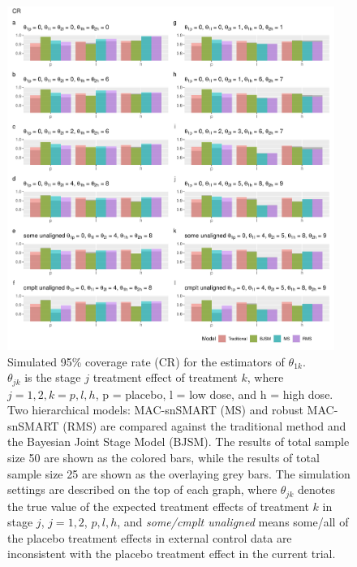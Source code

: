 \begin{figure}
\includegraphics[width=0.95\textwidth]{chapters/figures/CR.pdf}
\caption{Simulated 95\% coverage rate (CR) for the estimators of $\theta_{1k}$.\\ $\theta_{jk}$ is the stage $j$ treatment effect of treatment $k$, where $j = 1,2, k = p, l, h$, p = placebo, l = low dose, and h = high dose. Two hierarchical models: MAC-snSMART (MS) and robust MAC-snSMART (RMS) are compared against the traditional method and the Bayesian Joint Stage Model (BJSM). The results of total sample size 50 are shown as the colored bars, while the results of total sample size 25 are shown as the overlaying grey bars. The simulation settings are described on the top of each graph, where $\theta_{jk}$ denotes the true value of the expected treatment effects of treatment $k$ in stage $j$, $j = 1, 2$, $p, l, h$, and \emph{some/cmplt unaligned} means some/all of the placebo treatment effects in external control data are inconsistent with the placebo treatment effect in the current trial.}
\label{fig:CR}
\end{figure}


